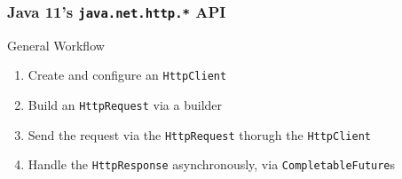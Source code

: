 \documentclass[presentation]{beamer}\mode<presentation>{\usetheme{AMSBolognaFC}}
\begin{document}
\begin{frame}[allowframebreaks]
    \frametitle{Java 11's \texttt{java.net.http.*} API}

    \begin{block}{General Workflow}
        \begin{enumerate}
            \item Create and configure an \texttt{HttpClient}
            \item Build an \texttt{HttpRequest} via a builder
            \item Send the request via the \texttt{HttpRequest} thorugh the \texttt{HttpClient}
            \item Handle the \texttt{HttpResponse} asynchronously, via \texttt{CompletableFuture}s
        \end{enumerate}
    \end{block}


\end{frame}
\end{document}
